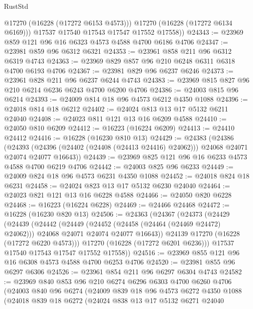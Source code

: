 \begin{lexlean}{RustStd}
\begin{coremodule}
            @17270
            (@16228 (@17272 @6153 @4573)))
          @17270
          (@16228 (@17272 @6134 @6169)))
        @17537
        @17540
        @17543
        @17547
        @17552
        @17558))
@24343 := @23969 @859 @121 @96 @16 @6323 @4573 @4588 @4700 @6186 @4706
@24347 := @23981 @859 @96 @6312 @6321
@24353 := @23961 @858 @211 @96 @6312 @6319 @4743
@24363 := @23969 @829 @857 @96 @210 @6248 @6311 @6318 @4700 @6193 @4706
@24367 := @23981 @829 @96 @6237 @6246
@24373 := @23961 @828 @211 @96 @6237 @6244 @4743
@24383 := @23969 @815 @827 @96 @210 @6214 @6236 @6243 @4700 @6200 @4706
@24386 := @24003 @815 @96 @6214
@24393 := @24009 @814 @18 @96 @4573 @6212 @4350 @1088
@24396 := @24018 @814 @18 @6212
@24402 := @24024 @813 @13 @17 @5132 @6211 @24040
@24408 := @24023 @811 @121 @13 @16 @6209 @4588
@24410 := @24050 @810 @6209
@24412 := @16223 (@16224 @6209)
@24413 := @24410 @24412
@24416 := @16228 (@16230 @810 @13)
@24429 := @24383
    (@24386
      (@24393 (@24396 (@24402 (@24408 (@24413 @24416) @24062))) @24068 @24071 @24074 @24077 @16643))
@24439 := @23969 @825 @121 @96 @16 @6233 @4573 @4588 @4700 @6219 @4706
@24442 := @24003 @825 @96 @6233
@24449 := @24009 @824 @18 @96 @4573 @6231 @4350 @1088
@24452 := @24018 @824 @18 @6231
@24458 := @24024 @823 @13 @17 @5132 @6230 @24040
@24464 := @24023 @821 @121 @13 @16 @6228 @4588
@24466 := @24050 @820 @6228
@24468 := @16223 (@16224 @6228)
@24469 := @24466 @24468
@24472 := @16228 (@16230 @820 @13)
@24506 := @24363
    (@24367
      (@24373
        (@24429
          (@24439
            (@24442
              (@24449
                (@24452 (@24458 (@24464 (@24469 @24472) @24062)))
                @24068
                @24071
                @24074
                @24077
                @16643))
            @24139
            @17270
            (@16228 (@17272 @6220 @4573)))
          @17270
          (@16228 (@17272 @6201 @6236)))
        @17537
        @17540
        @17543
        @17547
        @17552
        @17558))
@24516 := @23969 @855 @121 @96 @16 @6308 @4573 @4588 @4700 @6253 @4706
@24520 := @23981 @855 @96 @6297 @6306
@24526 := @23961 @854 @211 @96 @6297 @6304 @4743
@24582 := @23969
    @840
    @853
    @96
    @210
    @6274
    @6296
    @6303
    @4700
    @6260
    @4706
    (@24003
      @840
      @96
      @6274
      (@24009
        @839
        @18
        @96
        @4573
        @6272
        @4350
        @1088
        (@24018
          @839
          @18
          @6272
          (@24024
            @838
            @13
            @17
            @5132
            @6271
            @24040

\end{coremodule}
\end{lexlean}
